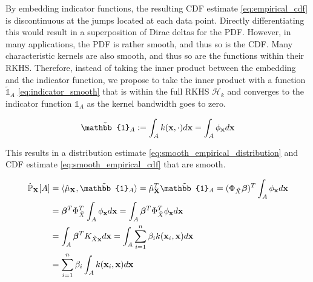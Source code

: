 \documentclass[twoside]{article} \usepackage{aistats2017}
\theoremstyle{definition}
\newcommand{\rv}[1]{{#1}}
\newcommand{\ds}[1]{\tilde{#1}}
\newcommand{\warn}[1]{{\color{red} #1}}
\begin{document}
		
		By embedding indicator functions, the resulting CDF estimate \eqref{eq:empirical_cdf} is discontinuous at the jumps located at each data point. Directly differentiating this would result in a superposition of Dirac deltas for the PDF. However, in many applications, the PDF is rather smooth, and thus so is the CDF. Many characteristic kernels are also smooth, and thus so are the functions within their RKHS. Therefore, instead of taking the inner product between the embedding and the indicator function, we propose to take the inner product with a function $\tilde{\mathbb{1}}_{A}$ \eqref{eq:indicator_smooth} that is within the full RKHS $\mathcal{H}_{k}$ and converges to the indicator function $\mathbb{1}_{A}$ as the kernel bandwidth goes to zero.
		
		\begin{equation}
			\tilde{\mathbb{1}}_{A} := \int_{A} k(\bvec{x}, \cdot) d\bvec{x} = \int_{A} \phi_{\bvec{x}} d\bvec{x}
		\label{eq:indicator_smooth}
		\end{equation}
		
		This results in a distribution estimate \eqref{eq:smooth_empirical_distribution} and CDF estimate \eqref{eq:smooth_empirical_cdf} that are smooth.

		\begin{equation}
		\begin{aligned}
			\hat{\mathbb{P}}_{\bvec{\rv{X}}}[A] &= \langle \hat{\mu}_{\bvec{\rv{X}}}, \tilde{\mathbb{1}}_{A} \rangle = \hat{\mu}_{\bvec{\rv{X}}}^{T} \tilde{\mathbb{1}}_{A} = (\Phi_{\ds{X}} \bm{\beta})^{T} \int_{A} \phi_{\bvec{x}} d\bvec{x} \\
			&= \bm{\beta}^{T} \Phi_{\ds{X}}^{T} \int_{A} \phi_{\bvec{x}} d\bvec{x} = \int_{A} \bm{\beta}^{T} \Phi_{\ds{X}}^{T} \phi_{\bvec{x}} d\bvec{x} \\
			&= \int_{A} \bm{\beta}^{T} K_{\ds{X} \bvec{x}} d\bvec{x} = \int_{A} \sum_{i = 1}^{n} \beta_{i} k(\bvec{x}_{i}, \bvec{x}) d\bvec{x} \\
			&= \sum_{i = 1}^{n} \beta_{i} \int_{A}  k(\bvec{x}_{i}, \bvec{x}) d\bvec{x} \\
		\end{aligned}
		\label{eq:smooth_empirical_distribution}
		\end{equation}	
		
\end{document}
